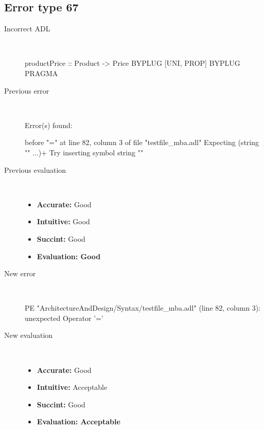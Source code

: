 \hrulefill

\subsection{Error type 67}
  \begin{description}
  \item[Incorrect ADL]~\\
\begin{adl}
productPrice :: Product -> Price BYPLUG [UNI, PROP] BYPLUG PRAGMA\end{adl}
  \item[Previous error]~\\
\begin{haskell}
Error(s) found:

before "=" at line 82, column 3 of file "testfile_mba.adl"
Expecting (string "" ...)+
Try inserting symbol string ""\end{haskell}
  \item[Previous evaluation]~\\
    \begin{itemize}
    \item \textbf{Accurate:} Good
    \item \textbf{Intuitive:} Good
    \item \textbf{Succint:} Good
    \item \textbf{Evaluation: Good}
    \end{itemize}
  \item[New error]~\\
\begin{haskell}
PE "ArchitectureAndDesign/Syntax/testfile_mba.adl" (line 82, column 3):
unexpected Operator '='\end{haskell}
  \item[New evaluation]~\\
    \begin{itemize}
    \item \textbf{Accurate:} Good
    \item \textbf{Intuitive:} Acceptable
    \item \textbf{Succint:} Good
    \item \textbf{Evaluation: Acceptable
}
    \end{itemize}
  \end{description}

\hrulefill


